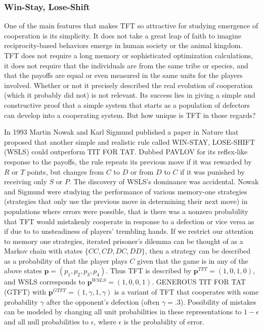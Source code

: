 \subsubsection {Win-Stay, Lose-Shift}
One of the main features that makes TFT so attractive for studying emergence of cooperation is its simplicity. It does not take a great leap of faith to imagine reciprocity-based behaviors emerge in human society or the animal kingdom. TFT does not require a long memory or sophisticated optimization calculations, it does not require that the individuals are from the same tribe or species, and that the payoffs are equal or even measured in the same units for the players involved. Whether or not it precisely described the real evolution of cooperation (which it probably did not) is not relevant. Its success lies in giving a simple and constructive proof that a simple system that starts as a population of defectors can develop into a cooperating system. But how unique is TFT in those regards?

In 1993 Martin Nowak and Karl Sigmund published a paper in Nature \cite{Nowak1993} that proposed that another simple and realistic rule called WIN-STAY, LOSE-SHIFT (WSLS) could outperform TIT FOR TAT. Dubbed PAVLOV for its reflex-like response to the payoffs, the rule repeats its previous move if it was rewarded by $R$ or $T$ points, but changes from $C$ to $D$ or from $D$ to $C$ if it was punished by receiving only $S$ or $P$. The discovery of WSLS's dominance was accidental. Nowak and Sigmund were studying the performance of various memory-one strategies (strategies that only use the previous move in determining their next move) in populations where errors were possible, that is there was a nonzero probability that TFT would mistakenly cooperate in response to a defection or vice versa as if due to to unsteadiness of players' trembling hands. If we restrict our attention to memory one strategies, iterated prisoner's dilemma can be thought of as a Markov chain with states $\{CC, CD, DC, DD\}$, then a strategy can be described as a probability of that the player plays $C$ given that the game is in any of the above states $\mathbf{p} = (p_1, p_2, p_3, p_4)$. Thus TFT is described by $\mathbf{p}^{TFT} = (1, 0, 1, 0)$, and WSLS corresponds to $\mathbf{p}^{WSLS} = (1, 0, 0, 1)$. GENEROUS TIT FOR TAT (GTFT) with $\mathbf{p}^{GTFT} = (1, \gamma, 1, \gamma)$ is a variant of TFT that cooperates with some probability $\gamma$ after the opponent's defection (often $\gamma = .3$). Possibility of mistakes can be modeled by changing all unit probabilities in these representations to $1-\epsilon$ and all null probabilities to $\epsilon$, where $\epsilon$ is the probability of error.

